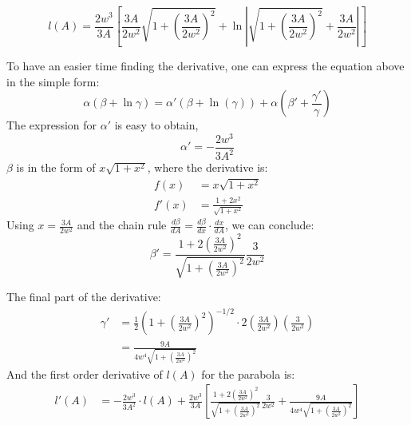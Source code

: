 \documentclass[12pt]{article}
\begin{document}
\begin{equation}
    l(A) = \frac{2w^3}{3A}\left[\frac{3A}{2w^2}\sqrt{1 + \left(\frac{3A}{2w^2}\right)^2}+\ln\left|\sqrt{1 + \left(\frac{3A}{2w^2}\right)^2} + \frac{3A}{2w^2}\right|\right]
\end{equation}

To have an easier time finding the derivative, one can express the equation above in the simple form:
\begin{equation}
    \alpha(\beta + \ln{\gamma}) = \alpha'(\beta + \ln(\gamma)) + \alpha\left(\beta' + \frac{\gamma'}{\gamma}\right)
\end{equation}
The expression for $\alpha'$ is easy to obtain,
\begin{equation}
    \alpha' = -\frac{2w^3}{3A^2}
\end{equation}
$\beta$ is in the form of $x\sqrt{1 + x^2}$, where the derivative is:
\begin{equation}
    \begin{split}
        f(x) &= x\sqrt{1 + x^2}
        \\
        f'(x) &= \frac{1 + 2x^2}{\sqrt{1 + x^2}}
    \end{split}
\end{equation}
Using $x = \frac{3A}{2w^2}$ and the chain rule $\frac{d\beta}{dA} = \frac{d\beta}{dx}\cdot\frac{dx}{dA}$, we can conclude:
\begin{equation}
    \beta' = \frac{1 + 2\left(\frac{3A}{2w^2}\right)^2}{\sqrt{1 + \left(\frac{3A}{2w^2}\right)^2}}\frac{3}{2w^2}
\end{equation}

The final part of the derivative:
\begin{equation}
    \begin{split}
        \gamma' &= \frac{1}{2}\left(1 + \left(\frac{3A}{2w^2}\right)^2\right)^{-1/2}\cdot2\left(\frac{3A}{2w^2}\right)\left(\frac{3}{2w^2}\right)
        \\&=\frac{9A}{4w^4\sqrt{1 + \left(\frac{3A}{2w^2}\right)^2}}
    \end{split}
\end{equation}
And the first order derivative of $l(A)$ for the parabola is:
\begin{equation}
    \begin{split}
        l'(A) &= -\frac{2w^3}{3A^2}\cdot l(A) +  \frac{2w^3}{3A}\left[\frac{1 + 2\left(\frac{3A}{2w^2}\right)^2}{\sqrt{1 + \left(\frac{3A}{2w^2}\right)^2}}\frac{3}{2w^2} +  \frac{9A}{4w^4\sqrt{1 + \left(\frac{3A}{2w^2}\right)^2}}\right]
    \end{split}
\end{equation}
\end{document}

